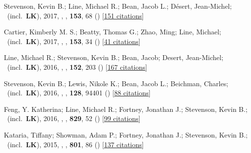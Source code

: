 \item[{\color{numcolor}\scriptsize12}] Stevenson, Kevin B.; Line, Michael R.; Bean, Jacob L.; D{\'e}sert, Jean-Michel; \etal\ (incl.\ \textbf{LK}), 2017, , \aj, \textbf{153}, 68 () [\href{https://ui.adsabs.harvard.edu/abs/2017AJ....153...68S}{151 citations}]

\item[{\color{numcolor}\scriptsize11}] Cartier, Kimberly M. S.; Beatty, Thomas G.; Zhao, Ming; Line, Michael; \etal\ (incl.\ \textbf{LK}), 2017, , \aj, \textbf{153}, 34 () [\href{https://ui.adsabs.harvard.edu/abs/2017AJ....153...34C}{41 citations}]

\item[{\color{numcolor}\scriptsize10}] Line, Michael R.; Stevenson, Kevin B.; Bean, Jacob; Desert, Jean-Michel; \etal\ (incl.\ \textbf{LK}), 2016, , \aj, \textbf{152}, 203 () [\href{https://ui.adsabs.harvard.edu/abs/2016AJ....152..203L}{167 citations}]

\item[{\color{numcolor}\scriptsize9}] Stevenson, Kevin B.; Lewis, Nikole K.; Bean, Jacob L.; Beichman, Charles; \etal\ (incl.\ \textbf{LK}), 2016, , \pasp, \textbf{128}, 94401 () [\href{https://ui.adsabs.harvard.edu/abs/2016PASP..128i4401S}{88 citations}]

\item[{\color{numcolor}\scriptsize8}] Feng, Y. Katherina; Line, Michael R.; Fortney, Jonathan J.; Stevenson, Kevin B.; \etal\ (incl.\ \textbf{LK}), 2016, , \apj, \textbf{829}, 52 () [\href{https://ui.adsabs.harvard.edu/abs/2016ApJ...829...52F}{99 citations}]

\item[{\color{numcolor}\scriptsize7}] Kataria, Tiffany; Showman, Adam P.; Fortney, Jonathan J.; Stevenson, Kevin B.; \etal\ (incl.\ \textbf{LK}), 2015, , \apj, \textbf{801}, 86 () [\href{https://ui.adsabs.harvard.edu/abs/2015ApJ...801...86K}{137 citations}]

